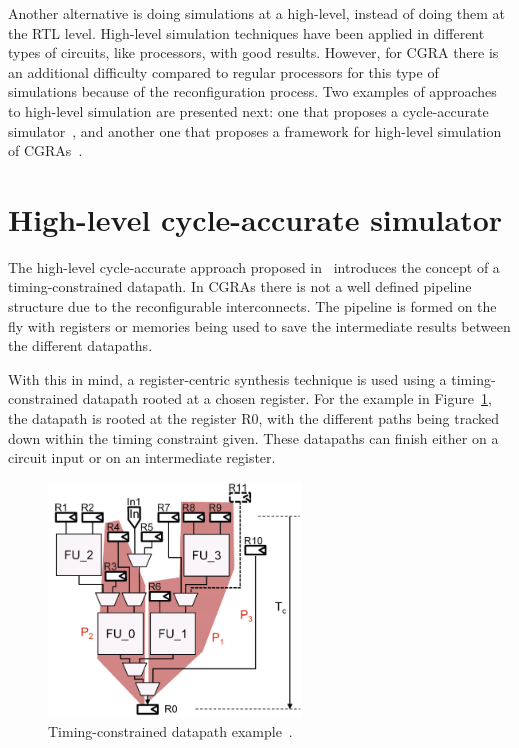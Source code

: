 Another alternative is doing simulations at a high-level, instead of doing them
at the RTL level. High-level simulation techniques have been applied in
different types of circuits, like processors, with good results. However, for
CGRA there is an additional difficulty compared to regular processors for this
type of simulations because of the reconfiguration process. Two examples of
approaches to high-level simulation are presented next: one that proposes a
cycle-accurate simulator~\cite{chen:CGRA}, and another one that proposes a
framework for high-level simulation of CGRAs~\cite{pasha:CGRA}.


\section{High-level cycle-accurate simulator}
\label{section:hlcycle}

The high-level cycle-accurate approach proposed in~\cite{chen:CGRA} introduces
the concept of a timing-constrained datapath. In CGRAs there is not a well
defined pipeline structure due to the reconfigurable interconnects. The pipeline
is formed on the fly with registers or memories being used to save the
intermediate results between the different datapaths.

With this in mind, a register-centric synthesis technique is used using a
timing-constrained datapath rooted at a chosen register. For the example in
Figure~\ref{fig:datapaths}, the datapath is rooted at the register R0, with the
different paths being tracked down within the timing constraint given. These
datapaths can finish either on a circuit input or on an intermediate register.

\begin{figure}[!htb]
	\centering
	\includegraphics[width=0.6\textwidth]{Figures/Datapaths.png}
	\caption{Timing-constrained datapath example~\cite{chen:CGRA}.}
	\label{fig:datapaths}
\end{figure}

